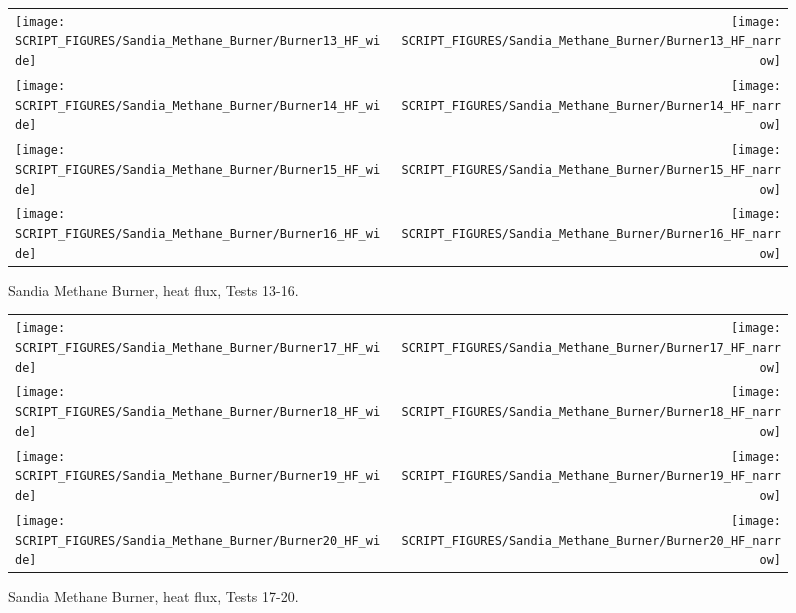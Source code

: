 \begin{figure}[p]
\begin{tabular*}{\textwidth}{l@{\extracolsep{\fill}}r}
\texttt{[image: SCRIPT\_FIGURES/Sandia\_Methane\_Burner/Burner13\_HF\_wide]} &
\texttt{[image: SCRIPT\_FIGURES/Sandia\_Methane\_Burner/Burner13\_HF\_narrow]} \\
\texttt{[image: SCRIPT\_FIGURES/Sandia\_Methane\_Burner/Burner14\_HF\_wide]} &
\texttt{[image: SCRIPT\_FIGURES/Sandia\_Methane\_Burner/Burner14\_HF\_narrow]} \\
\texttt{[image: SCRIPT\_FIGURES/Sandia\_Methane\_Burner/Burner15\_HF\_wide]} &
\texttt{[image: SCRIPT\_FIGURES/Sandia\_Methane\_Burner/Burner15\_HF\_narrow]} \\
\texttt{[image: SCRIPT\_FIGURES/Sandia\_Methane\_Burner/Burner16\_HF\_wide]} &
\texttt{[image: SCRIPT\_FIGURES/Sandia\_Methane\_Burner/Burner16\_HF\_narrow]}
\end{tabular*}
\caption[Sandia Methane Burner, heat flux, Tests 13-16] {Sandia Methane Burner, heat flux, Tests 13-16.}
\label{Sandia_Methane_Burner_HF_4}
\end{figure}

\begin{figure}[p]
\begin{tabular*}{\textwidth}{l@{\extracolsep{\fill}}r}
\texttt{[image: SCRIPT\_FIGURES/Sandia\_Methane\_Burner/Burner17\_HF\_wide]} &
\texttt{[image: SCRIPT\_FIGURES/Sandia\_Methane\_Burner/Burner17\_HF\_narrow]} \\
\texttt{[image: SCRIPT\_FIGURES/Sandia\_Methane\_Burner/Burner18\_HF\_wide]} &
\texttt{[image: SCRIPT\_FIGURES/Sandia\_Methane\_Burner/Burner18\_HF\_narrow]} \\
\texttt{[image: SCRIPT\_FIGURES/Sandia\_Methane\_Burner/Burner19\_HF\_wide]} &
\texttt{[image: SCRIPT\_FIGURES/Sandia\_Methane\_Burner/Burner19\_HF\_narrow]} \\
\texttt{[image: SCRIPT\_FIGURES/Sandia\_Methane\_Burner/Burner20\_HF\_wide]} &
\texttt{[image: SCRIPT\_FIGURES/Sandia\_Methane\_Burner/Burner20\_HF\_narrow]}
\end{tabular*}
\caption[Sandia Methane Burner, heat flux, Tests 17-20] {Sandia Methane Burner, heat flux, Tests 17-20.}
\label{Sandia_Methane_Burner_HF_5}
\end{figure}

